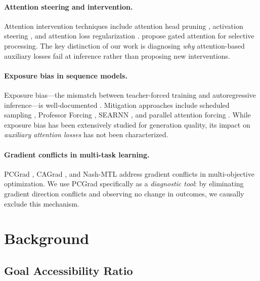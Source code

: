 \documentclass[11pt]{article}
\begin{document}
\paragraph{Attention steering and intervention.}
Attention intervention techniques include attention head pruning \citep{voita2019analyzing,michel2019sixteen}, activation steering \citep{li2024inference,turner2023activation}, and attention loss regularization \citep{ghader2017does,strubell2018linguistically}. \citet{qiu2025gated} propose gated attention for selective processing. The key distinction of our work is diagnosing \emph{why} attention-based auxiliary losses fail at inference rather than proposing new interventions.

\paragraph{Exposure bias in sequence models.}
Exposure bias---the mismatch between teacher-forced training and autoregressive inference---is well-documented \citep{ranzato2016sequence,wiseman2016sequence,bengio2015scheduled}. Mitigation approaches include scheduled sampling \citep{bengio2015scheduled}, Professor Forcing \citep{lamb2016professor}, SEARNN \citep{leblond2018searnn}, and parallel attention forcing \citep{dou2022parallel}. While exposure bias has been extensively studied for generation quality, its impact on \emph{auxiliary attention losses} has not been characterized.

\paragraph{Gradient conflicts in multi-task learning.}
PCGrad \citep{yu2020gradient}, CAGrad \citep{liu2021conflict}, and Nash-MTL \citep{navon2022multi} address gradient conflicts in multi-objective optimization. We use PCGrad specifically as a \emph{diagnostic tool}: by eliminating gradient direction conflicts and observing no change in outcomes, we causally exclude this mechanism.

\section{Background}

\subsection{Goal Accessibility Ratio}
\end{document}
